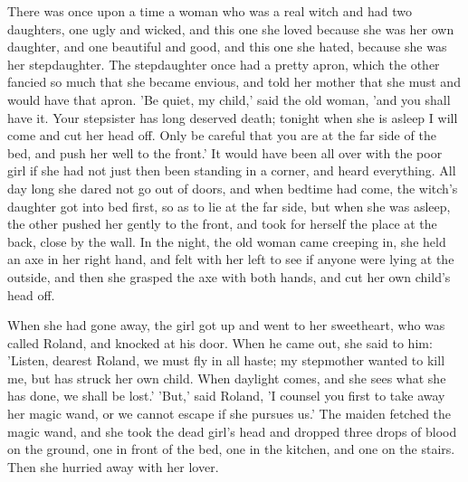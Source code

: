 \documentclass[12pt]{book}
\begin{document}
There was once upon a time a woman who was a real witch and had two
daughters, one ugly and wicked, and this one she loved because she was
her own daughter, and one beautiful and good, and this one she hated,
because she was her stepdaughter. The stepdaughter once had a pretty
apron, which the other fancied so much that she became envious, and
told her mother that she must and would have that apron. 'Be quiet, my
child,' said the old woman, 'and you shall have it. Your stepsister
has long deserved death; tonight when she is asleep I will come and
cut her head off. Only be careful that you are at the far side of the
bed, and push her well to the front.' It would have been all over with
the poor girl if she had not just then been standing in a corner, and
heard everything. All day long she dared not go out of doors, and when
bedtime had come, the witch's daughter got into bed first, so as to
lie at the far side, but when she was asleep, the other pushed her
gently to the front, and took for herself the place at the back, close
by the wall. In the night, the old woman came creeping in, she held an
axe in her right hand, and felt with her left to see if anyone were
lying at the outside, and then she grasped the axe with both hands,
and cut her own child's head off.

When she had gone away, the girl got up and went to her sweetheart,
who was called Roland, and knocked at his door. When he came out, she
said to him: 'Listen, dearest Roland, we must fly in all haste; my
stepmother wanted to kill me, but has struck her own child. When
daylight comes, and she sees what she has done, we shall be lost.'
'But,' said Roland, 'I counsel you first to take away her magic wand,
or we cannot escape if she pursues us.' The maiden fetched the magic
wand, and she took the dead girl's head and dropped three drops of
blood on the ground, one in front of the bed, one in the kitchen, and
one on the stairs. Then she hurried away with her lover.
\end{document}
